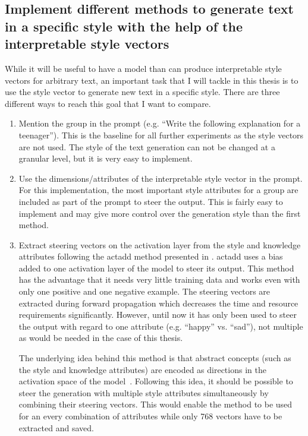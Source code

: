 \subsection{Implement different methods to generate text in a specific style with the help of the interpretable style vectors}
While it will be useful to have a model than can produce interpretable style vectors for arbitrary text, an important task that I will tackle in this thesis is to use the style vector to generate new text in a specific style. There are three different ways to reach this goal that I want to compare.
\begin{enumerate}
	\item
	      Mention the group in the prompt (e.g. \enquote{Write the following explanation for a teenager}). This is the baseline for all further experiments as the style vectors are not used. The style of the text generation can not be changed at a granular level, but it is very easy to implement.
	\item
	      Use the dimensions/attributes of the interpretable style vector in the prompt. For this implementation, the most important style attributes for a group are included as part of the prompt to steer the output. This is fairly easy to implement and may give more control over the generation style than the first method.
	\item
	      Extract steering vectors on the activation layer from the style and knowledge attributes following the \ac{actadd} method presented in \citet{turnerActivationAdditionSteering2024}. \Ac{actadd} uses a bias added to one activation layer of the model to steer its output. This method has the advantage that it needs very little training data and works even with only one positive and one negative example. The steering vectors are extracted during forward propagation which decreases the time and resource requirements significantly. However, until now it has only been used to steer the output with regard to one attribute (e.g. \enquote{happy} vs. \enquote{sad}), not multiple as would be needed in the case of this thesis.

	      The underlying idea behind this method is that abstract concepts (such as the style and knowledge attributes) are encoded as directions in the activation space of the model~\cite{parkLinearRepresentationHypothesis2024,rimsky-etal-2024-steering}. Following this idea, it should be possible to steer the generation with multiple style attributes simultaneously by combining their steering vectors. This would enable the method to be used for an every combination of attributes while only 768 vectors have to be extracted and saved.
\end{enumerate}

